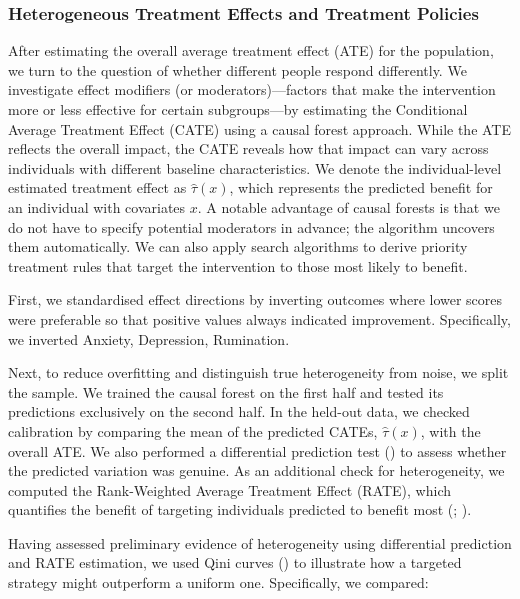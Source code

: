 \documentclass[
  single column]{article}
\begin{document}
\subsubsection{Heterogeneous Treatment Effects and Treatment
Policies}\label{heterogeneous-treatment-effects-and-treatment-policies}

After estimating the overall average treatment effect (ATE) for the
population, we turn to the question of whether different people respond
differently. We investigate effect modifiers (or moderators)---factors
that make the intervention more or less effective for certain
subgroups---by estimating the Conditional Average Treatment Effect
(CATE) using a causal forest approach. While the ATE reflects the
overall impact, the CATE reveals how that impact can vary across
individuals with different baseline characteristics. We denote the
individual-level estimated treatment effect as \(\hat{\tau}(x)\), which
represents the predicted benefit for an individual with covariates
\(x\). A notable advantage of causal forests is that we do not have to
specify potential moderators in advance; the algorithm uncovers them
automatically. We can also apply search algorithms to derive priority
treatment rules that target the intervention to those most likely to
benefit.

First, we standardised effect directions by inverting outcomes where
lower scores were preferable so that positive values always indicated
improvement. Specifically, we inverted Anxiety, Depression, Rumination.

Next, to reduce overfitting and distinguish true heterogeneity from
noise, we split the sample. We trained the causal forest on the first
half and tested its predictions exclusively on the second half. In the
held-out data, we checked calibration by comparing the mean of the
predicted CATEs, \(\hat{\tau}(x)\), with the overall ATE. We also
performed a differential prediction test
() to assess whether the
predicted variation was genuine. As an additional check for
heterogeneity, we computed the Rank-Weighted Average Treatment Effect
(RATE), which quantifies the benefit of targeting individuals predicted
to benefit most (;
).

Having assessed preliminary evidence of heterogeneity using differential
prediction and RATE estimation, we used Qini curves
() to illustrate how a
targeted strategy might outperform a uniform one. Specifically, we
compared:
\end{document}
